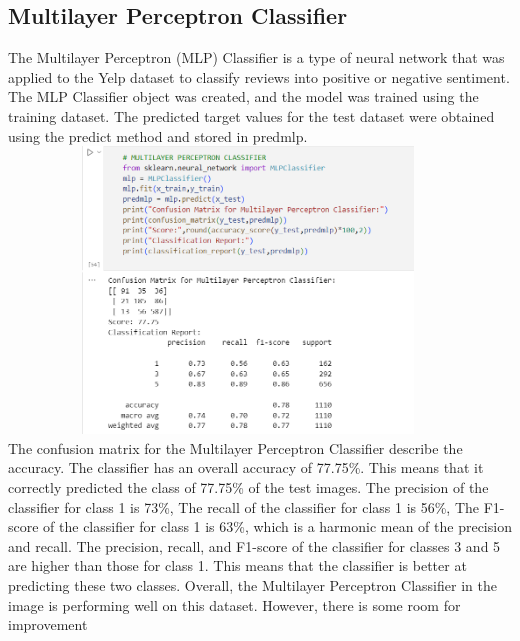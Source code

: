 \documentclass[a4paper, 12pt]{report}
\begin{document}
\subsection{Multilayer Perceptron Classifier}
The Multilayer Perceptron (MLP) Classifier is a type of neural network that was applied to the Yelp dataset to classify reviews into positive or negative sentiment. The MLP Classifier object was created, and the model was trained using the training dataset. The predicted target values for the test dataset were obtained using the predict method and stored in predmlp.\\
\includegraphics[height=3in,width=5in]{21}\\
The confusion matrix for the Multilayer Perceptron Classifier describe the accuracy.
The classifier has an overall accuracy of 77.75\%. This means that it correctly predicted the class of 77.75\% of the test images.
The precision of the classifier for class 1 is 73\%,
The recall of the classifier for class 1 is 56\%, 
The F1-score of the classifier for class 1 is 63\%, which is a harmonic mean of the precision and recall.
The precision, recall, and F1-score of the classifier for classes 3 and 5 are higher than those for class 1. This means that the classifier is better at predicting these two classes.
Overall, the Multilayer Perceptron Classifier in the image is performing well on this dataset. However, there is some room for improvement
\pagebreak
\end{document}
